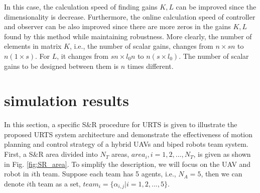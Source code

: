 \documentclass{ieeeaccess}
\newtheorem{remark}{Remark}
\begin{document}
In this case, the calculation speed of finding gains $K,L$ can be improved since the dimensionality is decrease. Furthermore, the online calculation speed of controller and observer can be also improved since there are more zeros in the gains $K,L$ found by this method while maintaining robustness. More clearly, the number of elements in matrix $K$, i.e., the number of scalar gains, changes from $n\times sn$ to $n(1\times s)$. For $L$, it changes from $sn\times l_0n$ to $n(s\times l_0)$. The number of scalar gains to be designed between them is $n$ times different.

\section{simulation results}
In this section, a specific S\&R procedure for URTS is given to illustrate the proposed URTS system architecture and demonstrate the effectiveness of motion planning and control strategy of a hybrid UAVs and biped robots team system. First, a S\&R area divided into $N_T$ areas, $area_i,i=1,2,...,N_T$, is given as shown in Fig. \ref{fig:SR_area}. To simplify the description, we will focus on the UAV and robot in $i$th team. Suppose each team has 5 agents, i.e., $N_A=5$, then we can denote $i$th team as a set, $team_i=\{ \alpha_{i,j} | i=1,2,...,5 \}$.
\end{document}

